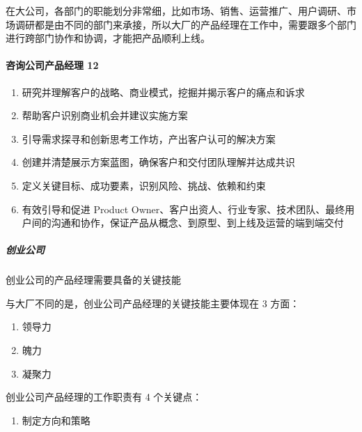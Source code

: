 \documentclass[letterpaper,10pt,english]{sphinxmanual}
\begin{document}
在大公司，各部门的职能划分非常细，比如市场、销售、运营推广、用户调研、市场调研都是由不同的部门来承接，所以大厂的产品经理在工作中，需要跟多个部门进行跨部门协作和协调，才能把产品顺利上线。


\paragraph{咨询公司产品经理 12\sphinxfootnotemark[194]}
\label{\detokenize{chapter_introduction/PM:id42}}%
\begin{footnotetext}[194]\sphinxAtStartFootnote
{}
%
\end{footnotetext}\ignorespaces \begin{enumerate}
%
\item {} 
研究并理解客户的战略、商业模式，挖掘并揭示客户的痛点和诉求

\item {} 
帮助客户识别商业机会并建议实施方案

\item {} 
引导需求探寻和创新思考工作坊，产出客户认可的解决方案

\item {} 
创建并清楚展示方案蓝图，确保客户和交付团队理解并达成共识

\item {} 
定义关键目标、成功要素，识别风险、挑战、依赖和约束

\item {} 
有效引导和促进 Product
Owner、客户出资人、行业专家、技术团队、最终用户间的沟通和协作，保证产品从概念、到原型、到上线及运营的端到端交付

\end{enumerate}


\subparagraph{创业公司}
\label{\detokenize{chapter_introduction/PM:id43}}
创业公司的产品经理需要具备的关键技能

与大厂不同的是，创业公司产品经理的关键技能主要体现在 3 方面：
\begin{enumerate}
%
\item {} 
领导力

\item {} 
魄力

\item {} 
凝聚力

\end{enumerate}

创业公司产品经理的工作职责有 4 个关键点：
\begin{enumerate}
%
\item {} 
制定方向和策略

\end{enumerate}
\end{document}
